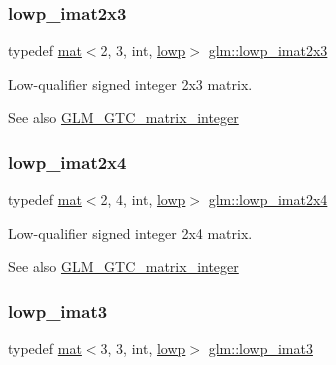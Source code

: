 \subsubsection{\texorpdfstring{lowp\+\_\+imat2x3}{lowp\_imat2x3}}
{\footnotesize\ttfamily typedef \hyperlink{structglm_1_1mat}{mat}$<$2, 3, int, \hyperlink{namespaceglm_a36ed105b07c7746804d7fdc7cc90ff25ae161af3fc695e696ce3bf69f7332bc2d}{lowp}$>$ \hyperlink{group__gtc__matrix__integer_ga4b3b731b3f8ad88feee31e945c3618ca}{glm\+::lowp\+\_\+imat2x3}}

Low-\/qualifier signed integer 2x3 matrix. \begin{DoxySeeAlso}{See also}
\hyperlink{group__gtc__matrix__integer}{G\+L\+M\+\_\+\+G\+T\+C\+\_\+matrix\+\_\+integer} 
\end{DoxySeeAlso}
\mbox{\label{group__gtc__matrix__integer_gabd8679c1108586fa89539a8bf029ad57}} 
\subsubsection{\texorpdfstring{lowp\+\_\+imat2x4}{lowp\_imat2x4}}
{\footnotesize\ttfamily typedef \hyperlink{structglm_1_1mat}{mat}$<$2, 4, int, \hyperlink{namespaceglm_a36ed105b07c7746804d7fdc7cc90ff25ae161af3fc695e696ce3bf69f7332bc2d}{lowp}$>$ \hyperlink{group__gtc__matrix__integer_gabd8679c1108586fa89539a8bf029ad57}{glm\+::lowp\+\_\+imat2x4}}

Low-\/qualifier signed integer 2x4 matrix. \begin{DoxySeeAlso}{See also}
\hyperlink{group__gtc__matrix__integer}{G\+L\+M\+\_\+\+G\+T\+C\+\_\+matrix\+\_\+integer} 
\end{DoxySeeAlso}
\mbox{\label{group__gtc__matrix__integer_gab66eef83170eea33b73938c19a82e4a0}} 
\subsubsection{\texorpdfstring{lowp\+\_\+imat3}{lowp\_imat3}}
{\footnotesize\ttfamily typedef \hyperlink{structglm_1_1mat}{mat}$<$3, 3, int, \hyperlink{namespaceglm_a36ed105b07c7746804d7fdc7cc90ff25ae161af3fc695e696ce3bf69f7332bc2d}{lowp}$>$ \hyperlink{group__gtc__matrix__integer_gab66eef83170eea33b73938c19a82e4a0}{glm\+::lowp\+\_\+imat3}}


